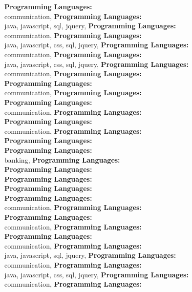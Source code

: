\textbf{Programming Languages:} \\
communication, \textbf{Programming Languages:} \\
java, javascript, sql, jquery, \textbf{Programming Languages:} \\
communication, \textbf{Programming Languages:} \\
java, javascript, css, sql, jquery, \textbf{Programming Languages:} \\
communication, \textbf{Programming Languages:} \\
java, javascript, css, sql, jquery, \textbf{Programming Languages:} \\
communication, \textbf{Programming Languages:} \\
\textbf{Programming Languages:} \\
communication, \textbf{Programming Languages:} \\
\textbf{Programming Languages:} \\
communication, \textbf{Programming Languages:} \\
\textbf{Programming Languages:} \\
communication, \textbf{Programming Languages:} \\
\textbf{Programming Languages:} \\
\textbf{Programming Languages:} \\
banking, \textbf{Programming Languages:} \\
\textbf{Programming Languages:} \\
\textbf{Programming Languages:} \\
\textbf{Programming Languages:} \\
\textbf{Programming Languages:} \\
communication, \textbf{Programming Languages:} \\
\textbf{Programming Languages:} \\
communication, \textbf{Programming Languages:} \\
\textbf{Programming Languages:} \\
communication, \textbf{Programming Languages:} \\
java, javascript, sql, jquery, \textbf{Programming Languages:} \\
communication, \textbf{Programming Languages:} \\
java, javascript, css, sql, jquery, \textbf{Programming Languages:} \\
communication, \textbf{Programming Languages:} \\
